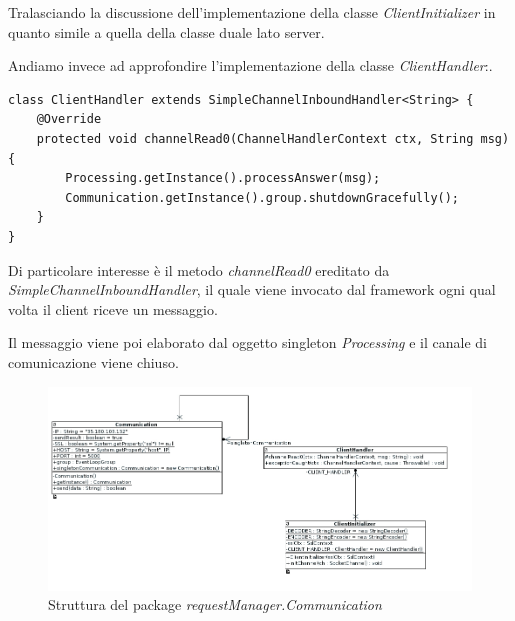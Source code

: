 Tralasciando la discussione dell'implementazione della classe \textit{ClientInitializer} in quanto simile a quella della classe duale lato server.

Andiamo invece ad approfondire l'implementazione della classe \textit{ClientHandler}:.

\begin{lstlisting}[caption={lettura di quanto inviato dal client},captionpos=b]
class ClientHandler extends SimpleChannelInboundHandler<String> {
	@Override
	protected void channelRead0(ChannelHandlerContext ctx, String msg) {
		Processing.getInstance().processAnswer(msg);
		Communication.getInstance().group.shutdownGracefully();
	}
}
\end{lstlisting}

Di particolare interesse è il metodo \textit{channelRead0} ereditato da \textit{SimpleChannelInboundHandler}, il quale viene invocato dal framework ogni qual volta il client riceve un messaggio.

Il messaggio viene poi elaborato dal oggetto singleton \textit{Processing} e il canale di comunicazione viene chiuso.

\begin{figure}[h]
	\includegraphics[width=\textwidth]{Immagini/CommunicationPackageClient}
	\caption{Struttura del package \textit{requestManager.Communication}}
	\label{fig:requestManagerCommunication}
\end{figure}







